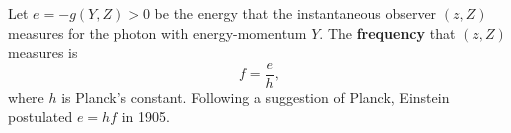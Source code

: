 Let $e = -g(Y, Z) > 0$ be the energy that the instantaneous observer $(z, Z)$ measures for the photon with energy-momentum $Y$. The \textbf{frequency} that $(z, Z)$ measures is
$$
f = \frac{e}{h},
$$
where $h$ is Planck's constant. Following a suggestion of Planck, Einstein postulated $e = hf$ in 1905.
